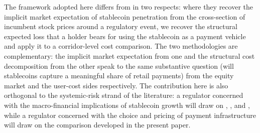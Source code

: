 The framework adopted here differs from \citet{copestake_etal_2026} in two respects: where they recover the implicit market expectation of stablecoin penetration from the cross-section of incumbent stock prices around a regulatory event, we recover the structural expected loss that a holder bears for using the stablecoin as a payment vehicle and apply it to a corridor-level cost comparison. The two methodologies are complementary: the implicit market expectation from one and the structural cost decomposition from the other speak to the same substantive question (will stablecoins capture a meaningful share of retail payments) from the equity market and the user-cost sides respectively. The contribution here is also orthogonal to the systemic-risk strand of the literature: a regulator concerned with the macro-financial implications of stablecoin growth will draw on \citet{aldasoro_frost_ito_2026}, \citet{bis_wp_1219}, and \citet{anadu_etal_2023_runs}, while a regulator concerned with the choice and pricing of payment infrastructure will draw on the comparison developed in the present paper.

